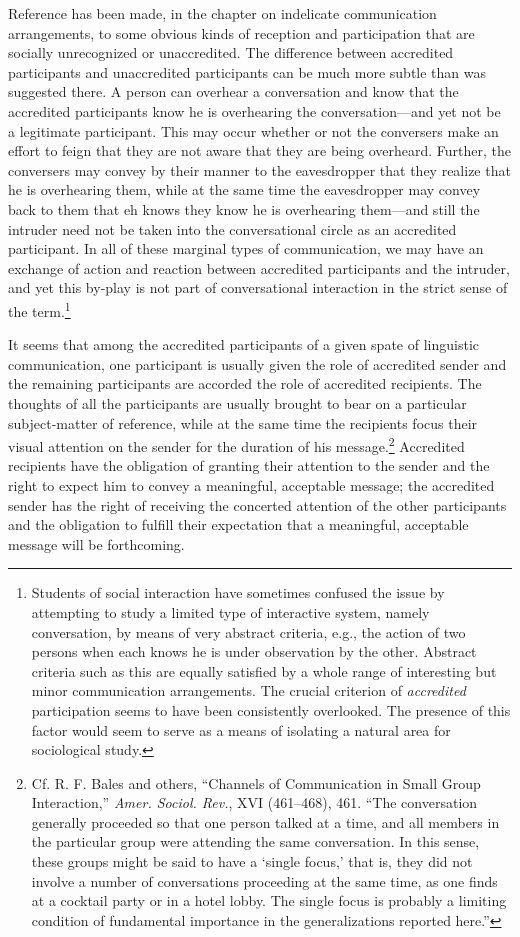 \documentclass[twoside,symmetric,nobib,justified]{tufte-book}
\begin{document}
Reference has been made, in the chapter on indelicate communication
arrangements, to some obvious kinds of reception and participation that
are socially unrecognized or unaccredited. The difference between
accredited participants and unaccredited participants can be much more
subtle than was suggested there. A person can overhear a conversation
and know that the accredited participants know he is overhearing the
conversation---and yet not be a legitimate participant. This may occur
whether or not the conversers make an effort to feign that they are not
aware that they are being overheard. Further, the conversers may convey
by their manner to the eavesdropper that they realize that he is
overhearing them, while at the same time the eavesdropper may convey
back to them that eh knows they know he is overhearing them---and still
the intruder need not be taken into the conversational circle as an
accredited participant. In all of these marginal types of communication,
we may have an exchange of action and reaction between accredited
participants and the intruder, and yet this by-play is not part of
conversational interaction in the strict sense of the term.\footnote{Students
  of social interaction have sometimes confused the issue by attempting
  to study a limited type of interactive system, namely conversation, by
  means of very abstract criteria, e.g., the action of two persons when
  each knows he is under observation by the other. Abstract criteria
  such as this are equally satisfied by a whole range of interesting but
  minor communication arrangements. The crucial criterion of
  \emph{accredited} participation seems to have been consistently
  overlooked. The presence of this factor would seem to serve as a means
  of isolating a natural area for sociological study.}

It seems that among the accredited participants of a given spate of
linguistic communication, one participant is usually given the role of
accredited sender and the remaining participants are accorded the role
of accredited recipients. The thoughts of all the participants are
usually brought to bear on a particular subject-matter of reference,
while at the same time the recipients focus their visual attention on
the sender for the duration of his message.\footnote{Cf. R. F. Bales and
  others, ``Channels of Communication in Small Group Interaction,''
  \emph{Amer. Sociol. Rev.}, XVI (461--468), 461. ``The conversation
  generally proceeded so that one person talked at a time, and all
  members in the particular group were attending the same conversation.
  In this sense, these groups might be said to have a `single focus,'
  that is, they did not involve a number of conversations proceeding at
  the same time, as one finds at a cocktail party or in a hotel lobby.
  The single focus is probably a limiting condition of fundamental
  importance in the generalizations reported here.''} Accredited
recipients have the obligation of granting their attention to the sender
and the right to expect him to convey a meaningful, acceptable message;
the accredited sender has the right of receiving the concerted attention
of the other participants and the obligation to fulfill their
expectation that a meaningful, acceptable message will be forthcoming.
\end{document}
